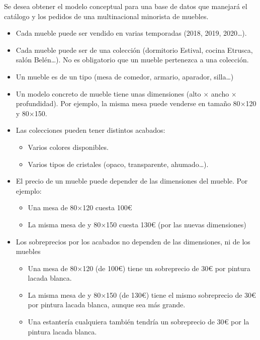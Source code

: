 Se desea obtener el modelo conceptual para una base de datos que manejará el catálogo y los pedidos de una multinacional minorista de muebles.
\begin{itemize}
\item Cada mueble puede ser vendido en varias temporadas (2018, 2019, 2020…).
\item Cada mueble puede ser de una colección (dormitorio Estival, cocina Etrusca, salón Belén…). No es obligatorio que un mueble pertenezca a una colección.
  
\item Un mueble es de un tipo (mesa de comedor, armario, aparador, silla\ldots)
\item Un modelo concreto de mueble tiene unas dimensiones (alto $\times$ ancho $\times$ profundidad). Por ejemplo, la misma mesa puede venderse en tamaño 80$\times$120 y 80$\times$150.
\item Las colecciones pueden tener distintos acabados:
  \begin{itemize}
  \item Varios colores disponibles.
  \item Varios tipos de cristales (opaco, transparente, ahumado…).
  \end{itemize}
\item El precio de un mueble puede depender de las dimensiones del mueble. Por ejemplo:
  \begin{itemize}
  \item Una mesa de 80$\times$120 cuesta 100{\euro}
  \item La misma mesa de y 80$\times$150 cuesta 130{\euro} (por las nuevas dimensiones)
  \end{itemize}
\item Los sobreprecios por los acabados no dependen de las dimensiones, ni de los muebles
  \begin{itemize}
  \item Una mesa de 80$\times$120 (de 100{\euro}) tiene un sobreprecio de 30{\euro} por pintura lacada blanca.
  \item La misma mesa de y 80$\times$150 (de 130{\euro}) tiene el mismo sobreprecio de 30{\euro} por pintura lacada blanca, aunque sea más grande.
  \item Una estantería cualquiera también tendría un sobreprecio de 30{\euro} por la pintura lacada blanca.
  \end{itemize}
  
\end{itemize}


